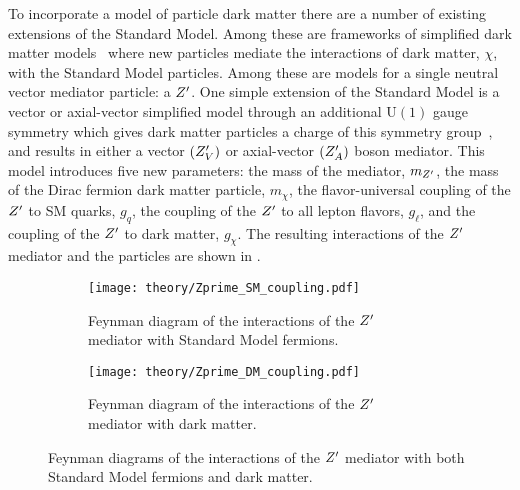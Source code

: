 To incorporate a model of particle dark matter there are a number of existing extensions of the Standard Model.
Among these are frameworks of simplified dark matter models~\cite{EXOT-2017-32,Jacques:2016dqz,Kahlhoefer:2015bea,Alves:2015pea} where new particles mediate the interactions of dark matter, $\chi$, with the Standard Model particles.
Among these are models for a single neutral vector mediator particle: a $\Zprime$.
One simple extension of the Standard Model is a vector or axial-vector simplified model through an additional $\mathrm{U}(1)$ gauge symmetry which gives dark matter particles a charge of this symmetry group~\cite{Abercrombie:2015wmb}, and results in either a vector $\left(Z^{\prime}_{V}\right)$ or axial-vector $\left(Z^{\prime}_{A}\right)$ boson mediator.
This model introduces five new parameters: the mass of the mediator, $m_{Z^{\prime}}$, the mass of the Dirac fermion dark matter particle, $m_{\chi}$, the flavor-universal coupling of the $\Zprime$ to SM quarks, $g_{q}$, the coupling of the $\Zprime$ to all lepton flavors, $g_{\ell}$, and the coupling of the $\Zprime$ to dark matter, $g_{\chi}$.
The resulting interactions of the $\Zprime$ mediator and the particles are shown in .

\begin{figure}[htbp]
 \centering
 \begin{subfigure}[t]{0.48\textwidth}
  \centering
  \texttt{[image: theory/Zprime\_SM\_coupling.pdf]}
  \caption[Feynman diagram of the interactions of the $\Zprime$ mediator with Standard Model fermions.]{%
   Feynman diagram of the interactions of the $\Zprime$ mediator with Standard Model fermions.}
  \label{fig:Zprime_SM_coupling}
 \end{subfigure}%
 \quad
 \begin{subfigure}[t]{0.48\textwidth}
  \centering
  \texttt{[image: theory/Zprime\_DM\_coupling.pdf]}
  \caption[Feynman diagram of the interactions of the $\Zprime$ mediator with dark matter.]{%
   Feynman diagram of the interactions of the $\Zprime$ mediator with dark matter.}
  \label{fig:Zprime_DM_coupling}
 \end{subfigure}%
 \caption[Feynman diagrams of the interactions of the $\Zprime$ mediator with both Standard Model fermions and dark matter.]{%
  Feynman diagrams of the interactions of the $\Zprime$ mediator with both Standard Model fermions and dark matter.}
 \label{fig:Zprime_interactions}
\end{figure}

